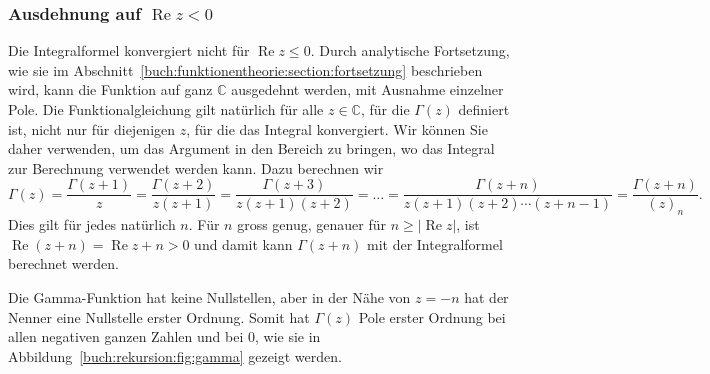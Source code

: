 %
%
\subsubsection{Ausdehnung auf $\operatorname{Re}z<0$}
%
%
Die Integralformel konvergiert nicht für $\operatorname{Re}z\le 0$.
Durch analytische Fortsetzung, wie sie im
Abschnitt~\ref{buch:funktionentheorie:section:fortsetzung}
beschrieben wird, kann die Funktion auf ganz $\mathbb{C}$ ausgedehnt
werden, mit Ausnahme einzelner Pole.
Die Funktionalgleichung gilt natürlich für alle $z\in\mathbb{C}$,
für die $\Gamma(z)$ definiert ist, nicht nur für diejenigen $z$, für
die das Integral konvergiert. 
Wir können Sie daher verwenden, um das Argument in den Bereich
zu bringen, wo das Integral zur Berechnung verwendet werden kann.
Dazu berechnen wir
\[
\Gamma(z)
=
\frac{\Gamma(z+1)}{z}
=
\frac{\Gamma(z+2)}{z(z+1)}
=
\frac{\Gamma(z+3)}{z(z+1)(z+2)}
=
\dots
=
\frac{\Gamma(z+n)}{z(z+1)(z+2)\cdots(z+n-1)}
=
\frac{\Gamma(z+n)}{(z)_n}.
\]
Dies gilt für jedes natürlich $n$.
Für $n$ gross genug, genauer für 
$n\ge |\operatorname{Re}z|$,
ist $\operatorname{Re}(z+n)=\operatorname{Re}z + n>0$ und damit
kann $\Gamma(z+n)$ mit der Integralformel berechnet werden.

Die Gamma-Funktion hat keine Nullstellen, aber in der Nähe von $z=-n$
hat der Nenner eine Nullstelle erster Ordnung.
Somit hat $\Gamma(z)$ Pole erster Ordnung bei allen negativen
ganzen Zahlen und bei $0$, wie sie in
Abbildung~\ref{buch:rekursion:fig:gamma} gezeigt werden.

%
%
